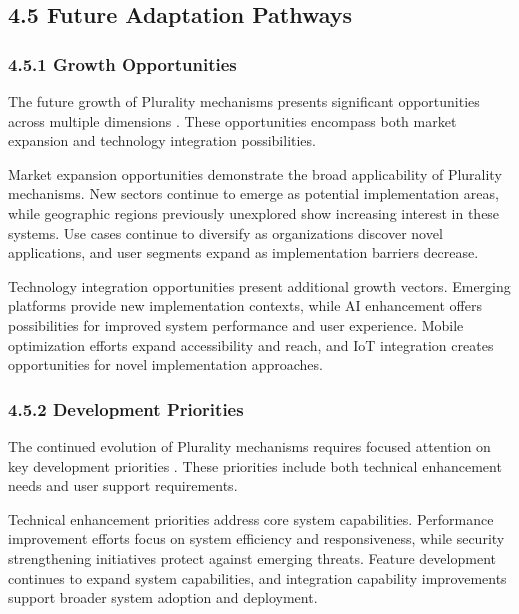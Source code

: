 \hypertarget{future-adaptation-pathways}{%
\subsection{4.5 Future Adaptation Pathways}\label{future-adaptation-pathways}}

\hypertarget{growth-opportunities}{%
\subsubsection{4.5.1 Growth Opportunities}\label{growth-opportunities}}

The future growth of Plurality mechanisms presents significant opportunities across multiple dimensions \citep{pdis2024}. These opportunities encompass both market expansion and technology integration possibilities.

Market expansion opportunities demonstrate the broad applicability of Plurality mechanisms. New sectors continue to emerge as potential implementation areas, while geographic regions previously unexplored show increasing interest in these systems. Use cases continue to diversify as organizations discover novel applications, and user segments expand as implementation barriers decrease.

Technology integration opportunities present additional growth vectors. Emerging platforms provide new implementation contexts, while AI enhancement offers possibilities for improved system performance and user experience. Mobile optimization efforts expand accessibility and reach, and IoT integration creates opportunities for novel implementation approaches.

\hypertarget{development-priorities}{%
\subsubsection{4.5.2 Development Priorities}\label{development-priorities}}

The continued evolution of Plurality mechanisms requires focused attention on key development priorities \citep{communitynotes2024}. These priorities include both technical enhancement needs and user support requirements.

Technical enhancement priorities address core system capabilities. Performance improvement efforts focus on system efficiency and responsiveness, while security strengthening initiatives protect against emerging threats. Feature development continues to expand system capabilities, and integration capability improvements support broader system adoption and deployment.

